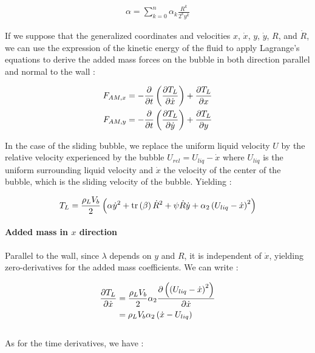 \begin{align}
\alpha = \sum_{k=0}^{n}\alpha_{k}\frac{R^{k}}{2^{k}y^{k}}
\end{align}

If we suppose that the generalized coordinates and velocities $x$, $\dot{x}$, $y$, $\dot{y}$, $R$, and $\dot{R}$, we can use the expression of the kinetic energy of the fluid to apply Lagrange's equations to derive the added mass forces on the bubble in both direction parallel and normal to the wall :

\begin{align}
F_{AM,x}&=-\frac{\partial }{\partial t}\left( \frac{\partial T_{L}}{\partial \dot{x}} \right)+\frac{\partial T_{L}}{\partial x}\\
F_{AM,y}&=-\frac{\partial }{\partial t}\left( \frac{\partial T_{L}}{\partial \dot{y}} \right)+\frac{\partial T_{L}}{\partial y}
\end{align}

In the case of the sliding bubble, we replace the uniform liquid velocity $U$ by the relative velocity experienced by the bubble $U_{rel}=U_{liq}-\dot{x}$ where $U_{liq}$ is the uniform surrounding liquid velocity and $\dot{x}$ the velocity of the center of the bubble, which is the sliding velocity of the bubble. Yielding :



\begin{align}
T_{L}=\frac{\rho_{L}V_{b}}{2}\left( \alpha \dot{y}^{2} +\mathrm{tr}\left( \beta \right)\dot{R}^{2}+\psi \dot{R}\dot{y} +\alpha_{2} \left( U_{liq}-\dot{x} \right)^{2}  \right)
\end{align}
 

\paragraph{Added mass in $x$ direction}

Parallel to the wall, since $\lambda$ depends on $y$ and $R$, it is independent of $\dot{x}$, yielding zero-derivatives for the added mass coefficients. We can write :

\begin{align}
\frac{\partial T_{L}}{\partial \dot{x}}&=\frac{\rho_{L}V_{b}}{2}\alpha_{2} \frac{\partial \left(  \left( U_{liq}-\dot{x} \right)^{2} \right) }{\partial \dot{x}}\\
&= \rho_{L}V_{b}\alpha_{2}\left( \dot{x}-U_{liq} \right)\\
\end{align}\\

As for the time derivatives, we have : 

